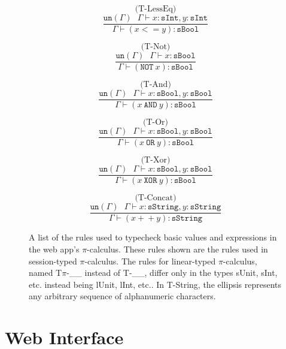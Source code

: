 \documentclass{l4proj}
\begin{document}
\begin{figure}[H]
\begin{subfigure}{0.32\textwidth}
\[\text{(T-LessEq)}\]
\[\frac{\texttt{un}(\Gamma) \:\:\: \Gamma \vdash x:\texttt{sInt}, y:\texttt{sInt}}{\Gamma \vdash (x<=y) : \texttt{sBool}}\]
\vspace{\fill}
\end{subfigure}
\begin{subfigure}{0.24\textwidth}
\[\text{(T-Not)}\]
\[\frac{\texttt{un}(\Gamma) \:\:\: \Gamma \vdash x:\texttt{sBool}}{\Gamma \vdash (\texttt{NOT}\:x) : \texttt{sBool}}\]
\vspace{\fill}
\end{subfigure}
\begin{subfigure}{0.36\textwidth}
\[\text{(T-And)}\]
\[\frac{\texttt{un}(\Gamma) \:\:\: \Gamma \vdash x:\texttt{sBool}, y:\texttt{sBool}}{\Gamma \vdash (x\:\texttt{AND}\:y) : \texttt{sBool}}\]
\vspace{\fill}
\end{subfigure}
\begin{subfigure}{0.36\textwidth}
\[\text{(T-Or)}\]
\[\frac{\texttt{un}(\Gamma) \:\:\: \Gamma \vdash x:\texttt{sBool}, y:\texttt{sBool}}{\Gamma \vdash (x\:\texttt{OR}\:y) : \texttt{sBool}}\]
\vspace{\fill}
\end{subfigure}
\begin{subfigure}{0.48\textwidth}
\[\text{(T-Xor)}\]
\[\frac{\texttt{un}(\Gamma) \:\:\: \Gamma \vdash x:\texttt{sBool}, y:\texttt{sBool}}{\Gamma \vdash (x\:\texttt{XOR}\:y) : \texttt{sBool}}\]
\end{subfigure}
\begin{subfigure}{0.48\textwidth}
\[\text{(T-Concat)}\]
\[\frac{\texttt{un}(\Gamma) \:\:\: \Gamma \vdash x:\texttt{sString}, y:\texttt{sString}}{\Gamma \vdash (x+\!+y) : \texttt{sString}}\]
\end{subfigure}
\caption{A list of the rules used to typecheck basic values and expressions in the web app's $\pi$-calculus. These rules shown are the rules used in session-typed $\pi$-calculus. The rules for linear-typed $\pi$-calculus, named T$\pi$-\_\_ instead of T-\_\_, differ only in the types sUnit, sInt, etc. instead being lUnit, lInt, etc.. In T-String, the ellipsis represents any arbitrary sequence of alphanumeric characters.}
\label{fig:exprType}
\end{figure}

\section{Web Interface}
\label{dsnInterface}
\end{document}
